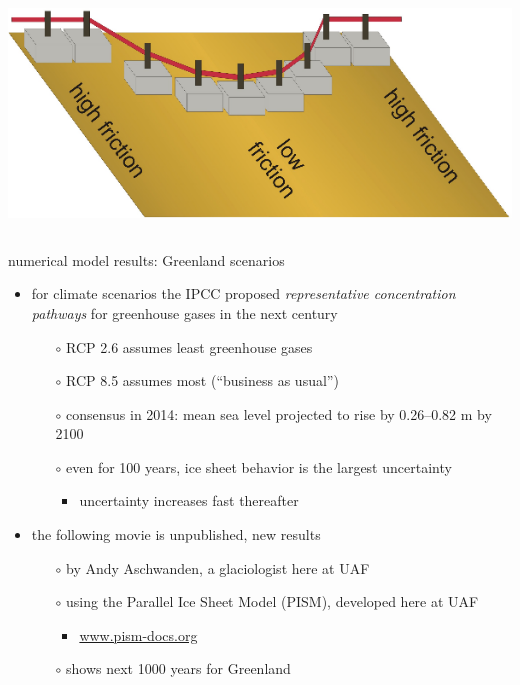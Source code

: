 \documentclass[10pt,hyperref={pdfpagelabels=true}]{beamer}
\begin{document}
\begin{frame}
\begin{columns}
\begin{column}{0.4\textwidth}
\vspace{0.3in}

\includegraphics[width=1.1\textwidth]{schoof-sliders}
\end{column}
\end{columns}
\end{frame}


\begin{frame}{numerical model results: Greenland scenarios}

\begin{itemize}
\item for climate scenarios the IPCC proposed \emph{representative concentration pathways} for greenhouse gases in the next century
    \begin{itemize}
    \item[$\circ$] RCP 2.6 assumes least greenhouse gases
    \item[$\circ$] RCP 8.5 assumes most (``business as usual'')
    \item[$\circ$] consensus in 2014: mean sea level projected to rise by 0.26--0.82 m by 2100
    \item[$\circ$] even for 100 years, ice sheet behavior is the largest uncertainty
        \begin{itemize}
        \item uncertainty increases fast thereafter
        \end{itemize}
    \end{itemize}
\item \alert{the following movie} is unpublished, new results
    \begin{itemize}
    \item[$\circ$] by Andy Aschwanden, a glaciologist here at UAF
    \item[$\circ$] using the Parallel Ice Sheet Model (PISM), developed here at UAF
        \begin{itemize}
        \item \url{www.pism-docs.org}
        \end{itemize}
    \item[$\circ$] shows next 1000 years for Greenland
    \end{itemize}
\end{itemize}
\end{frame}
\end{document}

